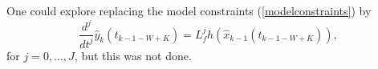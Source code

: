 One could explore replacing the model 
constraints (\ref{modelconstraints}) by
\begin{equation}
\frac{d^j}{dt^j} \hat{y}_k(t_{k-1-W+K}) = L_f^j h(\hat{x}_{k-1}(t_{k-1-W+K})),
\label{nonlinmodelconstraints}
\end{equation}
for $j = 0, \ldots, J$, but this was not done.













